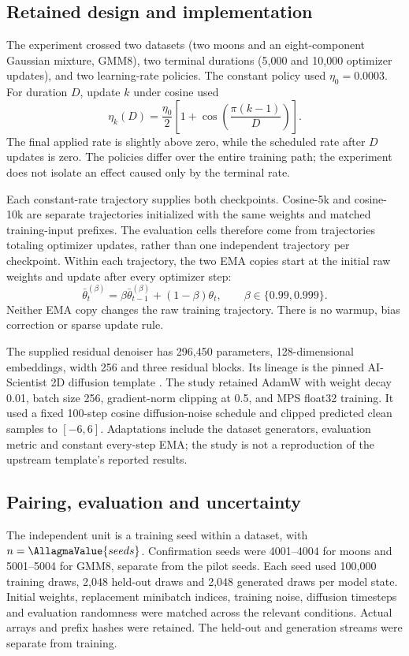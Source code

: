\subsection{Retained design and implementation}
The experiment crossed two datasets (two moons and an eight-component Gaussian
mixture, GMM8), two terminal durations (5,000 and 10,000 optimizer updates), and
two learning-rate policies. The constant policy used $\eta_0=0.0003$. For
duration $D$, update $k$ under cosine used
\begin{equation}
\eta_k(D)=\frac{\eta_0}{2}\left[1+\cos\!\left(\frac{\pi(k-1)}{D}\right)\right].
\end{equation}
The final applied rate is slightly above zero, while the scheduled rate after
$D$ updates is zero. The policies differ over the entire training path; the
experiment does not isolate an effect caused only by the terminal rate.

Each constant-rate trajectory supplies both checkpoints. Cosine-5k and
cosine-10k are separate trajectories initialized with the same weights and
matched training-input prefixes. The  evaluation cells
therefore come from  trajectories totaling
 optimizer updates, rather than one independent
trajectory per checkpoint. Within each trajectory, the two EMA copies start
at the initial raw weights and update after every optimizer step:
\begin{equation}
\bar\theta_t^{(\beta)}=\beta\bar\theta_{t-1}^{(\beta)}+(1-\beta)\theta_t,
\qquad \beta\in\{0.99,0.999\}.
\end{equation}
Neither EMA copy changes the raw training trajectory. There is no warmup,
bias correction or sparse update rule.

The supplied residual denoiser has 296,450 parameters, 128-dimensional
embeddings, width 256 and three residual blocks. Its lineage is the pinned
AI-Scientist 2D diffusion template \cite{Sakana2025}. The study retained
AdamW with weight decay 0.01, batch size 256, gradient-norm clipping at 0.5,
and MPS float32 training. It used a fixed 100-step cosine diffusion-noise
schedule and clipped predicted clean samples to $[-6,6]$. Adaptations include
the dataset generators, evaluation metric and constant every-step EMA; the
study is not a reproduction of the upstream template's reported results.

\subsection{Pairing, evaluation and uncertainty}
The independent unit is a training seed within a dataset, with
$n=\AllagmaValue{seeds}$. Confirmation seeds were 4001--4004 for moons and
5001--5004 for GMM8, separate from the pilot seeds. Each seed used 100,000
training draws, 2,048 held-out draws and 2,048 generated draws per model state.
Initial weights, replacement minibatch indices, training noise, diffusion
timesteps and evaluation randomness were matched across the relevant
conditions. Actual arrays and prefix hashes were retained. The held-out and
generation streams were separate from training.

